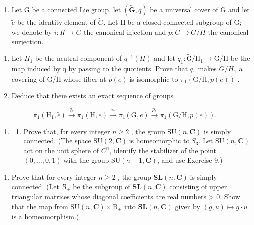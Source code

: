 \begin{enumerate}
\def\labelenumi{\arabic{enumi})}
\setcounter{enumi}{8}
\tightlist
\item
  Let G be a connected Lie group, let \((\widetilde{\mathbf{G}}, q)\) be a universal cover of G and let \(\widetilde{e}\) be the identity element of \(\widetilde{G}\). Let H be a closed connected subgroup of G; we denote by \(i: H \to G\) the canonical injection and \(p: G \to G/H\) the canonical surjection.
\end{enumerate}

\begin{enumerate}
\def\labelenumi{\alph{enumi})}
\item
  Let \(H_{1}\) be the neutral component of \(\overline{q}^{-1}(H)\) and let \(q_{1}\colon\widetilde{\mathrm{G}}/\mathrm{H}_{1}\to\mathrm{G}/\mathrm{H}\) be the map induced by q by passing to the quotients. Prove that \(q_{1}\) makes \(\widetilde{G}/H_{1}\) a covering of G/H whose fiber at \(p(e)\) is isomorphic to \(\pi_{1}(\mathrm{G}/\mathrm{H},p(e))\) .
\item
  Deduce that there exists an exact sequence of groups
\end{enumerate}

\[
\pi_ {1} (\mathrm{H} _ {1}, \widetilde {e}) \xrightarrow {q _ {*}} \pi_ {1} (\mathrm{H}, e) \xrightarrow {i _ {*}} \pi_ {1} (\mathrm{G}, e) \xrightarrow {p _ {*}} \pi_ {1} (\mathrm{G} / \mathrm{H}, p (e)).
\]

\begin{enumerate}
\def\labelenumi{\arabic{enumi})}
\setcounter{enumi}{9}
\tightlist
\item
  \begin{enumerate}
  \def\labelenumii{\alph{enumii})}
  \tightlist
  \item
    Prove that, for every integer \(n \geqslant 2\) , the group \(\mathrm{SU}(n, \mathbf{C})\) is simply connected. (The space \(\mathrm{SU}(2, \mathbf{C})\) is homeomorphic to \(S_{3}\). Let \(\mathrm{SU}(n, \mathbf{C})\) act on the unit sphere of \(C^{n}\), identify the stabilizer of the point \((0, \ldots, 0, 1)\) with the group \(\mathrm{SU}(n - 1, \mathbf{C})\), and use Exercise 9.)
  \end{enumerate}
\end{enumerate}

\begin{enumerate}
\def\labelenumi{\alph{enumi})}
\setcounter{enumi}{1}
\tightlist
\item
  Prove that for every integer \(n \geqslant 2\) , the group \(\mathbf{SL}(n, \mathbf{C})\) is simply connected. (Let \(B_{+}\) be the subgroup of \(\mathbf{SL}(n, \mathbf{C})\) consisting of upper triangular matrices whose diagonal coefficients are real numbers \textgreater{} 0. Show that the map from \(\mathrm{SU}(n, \mathbf{C}) \times \mathrm{B}_{+}\) into \(\mathbf{SL}(n, \mathbf{C})\) given by \((g, u) \mapsto g \cdot u\) is a homeomorphism.)
\end{enumerate}

